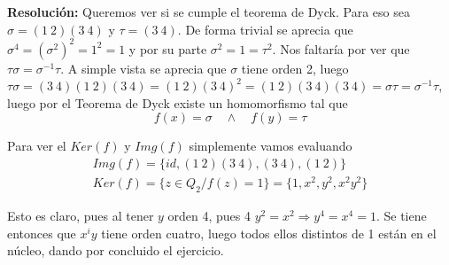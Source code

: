 \documentclass{article}
\begin{document}
\begin{enumerate}
\textbf{Resolución:} Queremos ver si se cumple el teorema de Dyck. Para eso sea $\sigma=(1\:2)(3\:4)$ y $\tau=(3\:4)$. De forma trivial se aprecia que $\sigma^4=(\sigma^2)^2=1^2=1$ y por su parte $\sigma^2=1=\tau^2$. Nos faltaría por ver que $\tau\sigma=\sigma^{-1}\tau$. A simple vista se aprecia que $\sigma$ tiene orden 2, luego $\tau\sigma=(3\:4)(1\:2)(3\:4)=(1\:2)(3\:4)^2=(1\:2)(3\:4)(3\:4)=\sigma\tau=\sigma^{-1}\tau$, luego por el Teorema de Dyck existe un homomorfismo tal que 
\begin{equation*}
f(x)=\sigma \quad \wedge \quad f(y)=\tau
\end{equation*}

Para ver el $Ker(f)$ y $Img(f)$ simplemente vamos evaluando
\begin{gather*}
Img(f)=\{id,(1\:2)(3\:4), (3\:4), (1\:2)\}\\
Ker(f)=\{z\in Q_2/f(z)=1\}=\{1,x^2,y^2,x^2y^2\}
\end{gather*}

Esto es claro, pues al tener $y$ orden 4, pues 4 $y^2=x^2\Rightarrow y^4=x^4=1$. Se tiene entonces que $x^iy$ tiene orden cuatro, luego todos ellos distintos de 1 están en el núcleo, dando por concluido el ejercicio.

\end{enumerate}
\end{document}
